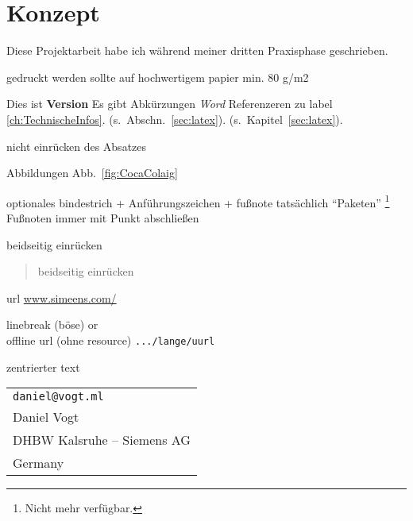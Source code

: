 \chapter{Konzept} 	%




\noindent
Diese Projektarbeit habe ich während meiner dritten Praxisphase geschrieben.

 








 


gedruckt werden sollte auf hochwertigem papier min.  80 g/m2


Dies ist \textbf{Version \hgbthesisDate} 
Es gibt Abkürzungen \va 
\emph{Word}
Referenzeren zu label \ref{ch:TechnischeInfos}.
(s.\ Abschn.~\ref{sec:latex}).
(s.\ Kapitel~\ref{sec:latex}).

nicht einrücken des Absatzes
\noindent


Abbildungen Abb.~\ref{fig:CocaColaig}

optionales bindestrich + Anführungszeichen + fußnote 
tat\-säch\-lich "`Paketen"' \footnote{Nicht mehr verfügbar.}
Fußnoten immer mit Punkt abschließen

beidseitig einrücken
\begin{quote}
    
    beidseitig einrücken
\end{quote}

url
\url{www.simeens.com/}

linebreak (böse)
\newline or \\

offline url (ohne resource)
\nolinkurl{.../lange/uurl}


zentrierter text 
\begin{center}%
\begin{tabular}{l}
\nolinkurl{daniel@vogt.ml} \\
Daniel Vogt \\
DHBW Kalsruhe -- Siemens AG\\
Germany
\end{tabular}
\end{center}


